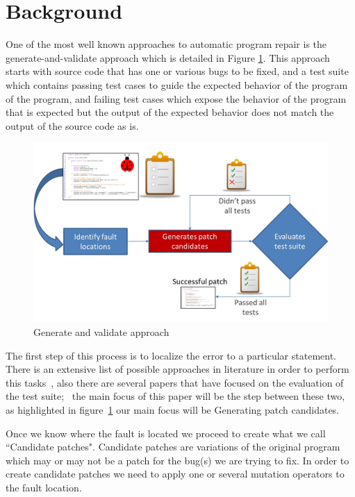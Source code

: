 \documentclass[conference]{IEEEtran}
\begin{document}
\section{Background}


One of the most well known approaches to automatic program repair is the
generate-and-validate approach which is detailed in Figure
\ref{fig:generateandvalidate}. This approach starts with source code that
has one or various bugs to be fixed, and a test suite which contains passing
test cases to guide the expected behavior of the program of the program, and failing test 
cases which expose the behavior of the program that is expected but the output
of the expected behavior does not match the output of the source code as is.



\begin{figure}[!h]
  \centering
    \includegraphics[scale=0.25]{Picture1}
  \caption{Generate and validate approach}
  \label{fig:generateandvalidate}
\end{figure}

The first step of this process is to localize the error to a particular 
statement. There is an extensive list of possible approaches in literature in 
order to perform this tasks~\cite{Jones05,Jones02,Chen02,legoues12,Qi13}, also there are several papers that have focused on the evaluation of the test suite;~\cite{Qi13,fan15} the main focus of this paper will be the step between these two, as highlighted in figure~\ref{fig:generateandvalidate} our main focus will be Generating patch candidates.

Once we know where the fault is located we proceed to create what we call 
``Candidate patches". Candidate patches are variations of the original program 
which may or may not be a patch for the bug(s) we are trying to fix. In order to 
create candidate patches we need to apply one or several mutation operators to 
the fault location. 
\end{document}
